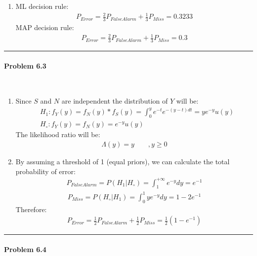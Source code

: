 \documentclass[12pt, letterpaper]{scrartcl}
\begin{document}
\begin{enumerate}[((a))]
    \item ML decision rule:
    \begin{align*}
        P_{Error}=\frac{2}{3}P_{FalseAlarm}+\frac{1}{3}P_{Miss}=0.3233
    \end{align*}
    MAP decision rule:
    \begin{align*}
        P_{Error}=\frac{2}{3}P_{FalseAlarm}+\frac{1}{3}P_{Miss}=0.3
    \end{align*}
\end{enumerate}



\hrule


\paragraph*{Problem 6.3} \hfill\\
\begin{enumerate}[((a))]
    \item 
    Since $S$ and $N$ are independent the distribution of $Y$ will be:
    \begin{align*}
        &H_1 : f_Y(y) = f_N(y)*f_S(y)=\int_{0}^{y} e^{-t}e^{-(y-t)dt}=ye^{-y}u(y)\\
        &H_\circ : f_Y(y) = f_N(y) = e^{-y}u(y)
    \end{align*}
    The likelihood ratio will be:
    \begin{align*}
        \Lambda(y)=y \qquad , y\geq0
    \end{align*}
    
    \item By assuming a threshold of 1 (equal priors), we can calculate the total probability of error:
    \begin{align*}
        P_{FalseAlarm}=P(H_1|H_\circ)=\int_1^{+\infty}e^{-y}dy=e^{-1}
    \end{align*}
    \begin{align*}
        P_{Miss}=P(H_\circ|H_1)=\int_0^{1}ye^{-y}dy=1-2e^{-1}
    \end{align*}
    Therefore:
    \begin{align*}
        P_{Error}=\frac{1}{2}P_{FalseAlarm}+\frac{1}{2}P_{Miss}=\frac{1}{2}(1-e^{-1})
    \end{align*}
\end{enumerate}
\hrule

\paragraph*{Problem 6.4} \hfill\\
\end{document}
